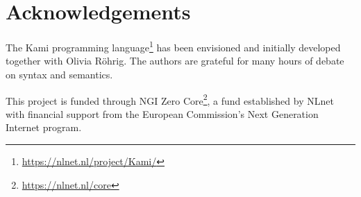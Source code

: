 \documentclass{scrartcl}
\theoremstyle{definition}
\theoremstyle{plain}
\begin{document}
\section*{Acknowledgements}
The Kami programming language\footnote{\url{https://nlnet.nl/project/Kami/}} has
been envisioned and initially developed together with Olivia R\"ohrig. The authors are grateful
for many hours of debate on syntax and semantics.

This project is funded through NGI Zero
Core\footnote{\url{https://nlnet.nl/core}}, a fund established by NLnet with
financial support from the European Commission's Next Generation Internet
program.



\end{document}
